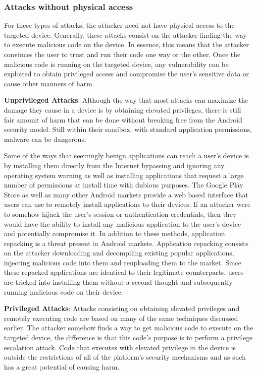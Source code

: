 \documentclass{sig-alternate}
\begin{document}
\subsubsection{Attacks without physical access}

For these types of attacks, the attacker need not have physical access to the targeted device. Generally, these attacks consist on the attacker finding the way to execute malicious code on the device. In essence, this means that the attacker convinces the user to trust and run their code one way or the other. Once the malicious code is running on the targeted device, any vulnerability can be exploited to obtain privileged access and compromise the user's sensitive data or cause other manners of harm.

\textbf{Unprivileged Attacks}: Although the way that most attacks can maximize the damage they cause in a device is by obtaining elevated privileges, there is still fair amount of harm that can be done without breaking free from the Android security model. Still within their sandbox, with standard application permissions, malware can be dangerous. 

Some of the ways that seemingly benign applications can reach a user's device is by installing them directly from the Internet bypassing and ignoring any operating system warning as well as installing applications that request a large number of permissions at install time with dubious purposes. The Google Play Store as well as many other Android markets provide a web based interface that users can use to remotely install applications to their devices. If an attacker were to somehow hijack the user's session or authentication credentials, then they would have the ability to install any malicious application to the user's device and potentially compromise it. In addition to these methods, application repacking is a threat present in Android markets. Application repacking consists on the attacker downloading and decompiling existing popular applications, injecting malicious code into them and reuploading them to the market. Since these repacked applications are identical to their legitimate counterparts, users are tricked into installing them without a second thought and subsequently running malicious code on their device.

\textbf{Privileged Attacks}: Attacks consisting on obtaining elevated privileges and remotely executing code are based on many of the same techniques discussed earlier. The attacker somehow finds a way to get malicious code to execute on the targeted device, the difference is that this code's purpose is to perform a privilege escalation attack. Code that executes with elevated privilege in the device is outside the restrictions of all of the platform's security mechanisms and as such has a great potential of causing harm.
\end{document}
